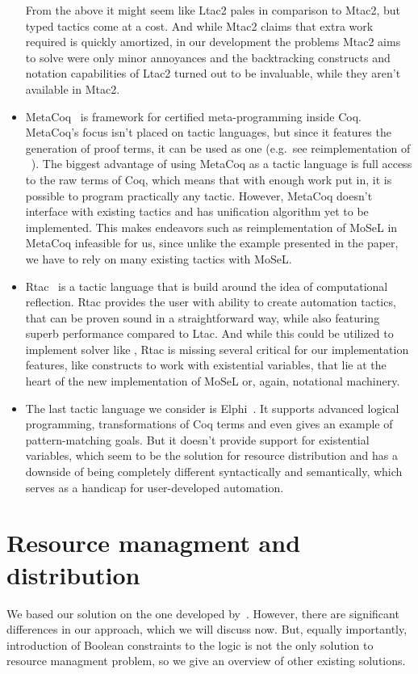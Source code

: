 \begin{itemize}
  From the above it might seem like Ltac2 pales in comparison to Mtac2, but typed tactics come at a cost.
  And while Mtac2 claims that extra work required is quickly amortized, in our development the problems Mtac2 aims to solve were only minor annoyances and the backtracking constructs and notation capabilities of Ltac2 turned out to be invaluable, while they aren't available in Mtac2.
\item MetaCoq~\cite{sozeauMetaCoqProject2020} is framework for certified meta-programming inside Coq.
  MetaCoq's focus isn't placed on tactic languages, but since it features the generation of proof terms, it can be used as one (e.g.\ see reimplementation of ~\cite[Section~4.2]{sozeauMetaCoqProject2020}).
  The biggest advantage of using MetaCoq as a tactic language is full access to the raw terms of Coq, which means that with enough work put in, it is possible to program practically any tactic.
  However, MetaCoq doesn't interface with existing tactics and has unification algorithm yet to be implemented.
  This makes endeavors such as reimplementation of MoSeL in MetaCoq infeasible for us, since unlike the example presented in the paper, we have to rely on many existing tactics with MoSeL.
\item Rtac~\cite{malechaExtensibleEfficientAutomation2016} is a tactic language that is build around the idea of computational reflection.
  Rtac provides the user with ability to create automation tactics, that can be proven sound in a straightforward way, while also featuring superb performance compared to Ltac.
  And while this could be utilized to implement solver like , Rtac is missing several critical for our implementation features, like constructs to work with existential variables, that lie at the heart of the new implementation of MoSeL or, again, notational machinery.
\item The last tactic language we consider is Elphi~\cite{tassiElpiExtensionLanguage2018}.
  It supports advanced logical programming, transformations of Coq terms and even gives an example of pattern-matching goals.
  But it doesn't provide support for existential variables, which seem to be the solution for resource distribution and has a downside of being completely different syntactically and semantically, which serves as a handicap for user-developed automation.
\end{itemize}

\section{Resource managment and distribution}
\label{sec:reso-managm-distr}
We based our solution on the one developed by~\citet{harlandResourceDistributionBooleanConstraints2003}.
However, there are significant differences in our approach, which we will discuss now.
But, equally importantly, introduction of Boolean constraints to the logic is not the only solution to resource managment problem, so we give an overview of other existing solutions.

